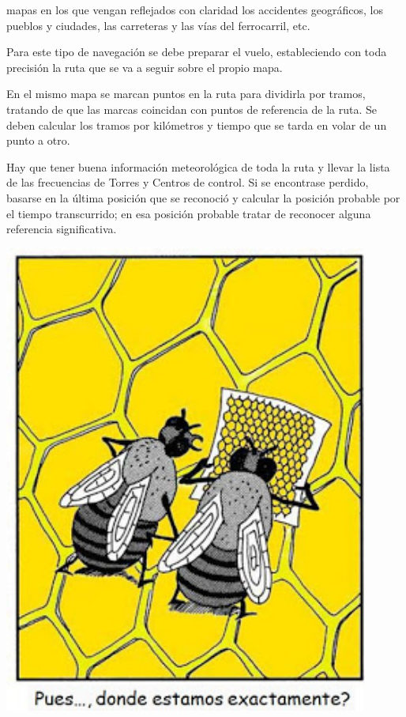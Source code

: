 \begin{minipage}[b]{0.650\linewidth}
	mapas en los que vengan
	reflejados con claridad los accidentes geogr\'aficos, los pueblos y
	ciudades, las carreteras y las v\'ias del ferrocarril, etc. \cite{Aena_SENASA_nav_aerea}

  Para este tipo de navegaci\'on se debe preparar el vuelo,
  estableciendo con toda precisi\'on la ruta que se va a seguir sobre
  el propio mapa.

  En el mismo mapa se marcan puntos en la ruta para dividirla por
  tramos, tratando de que las marcas coincidan con puntos de
  referencia de la ruta. Se deben calcular los tramos por kil\'ometros
  y tiempo que se tarda en volar de un punto a otro.

  Hay que tener buena informaci\'on meteorol\'ogica de toda la ruta y
  llevar la lista de las frecuencias de Torres y Centros de control.
  Si se encontrase perdido, basarse en la \'ultima posici\'on que se
  reconoci\'o y calcular la posici\'on probable por el tiempo
  transcurrido; en esa posici\'on probable tratar de reconocer alguna
  referencia significativa.

\end{minipage}
\begin{minipage}[b]{0.350\linewidth}
	\centering
	\includegraphics[width=0.9\textwidth]{06.radionavegacion/Imagenes/donde_estamos.jpg}  
\end{minipage}




